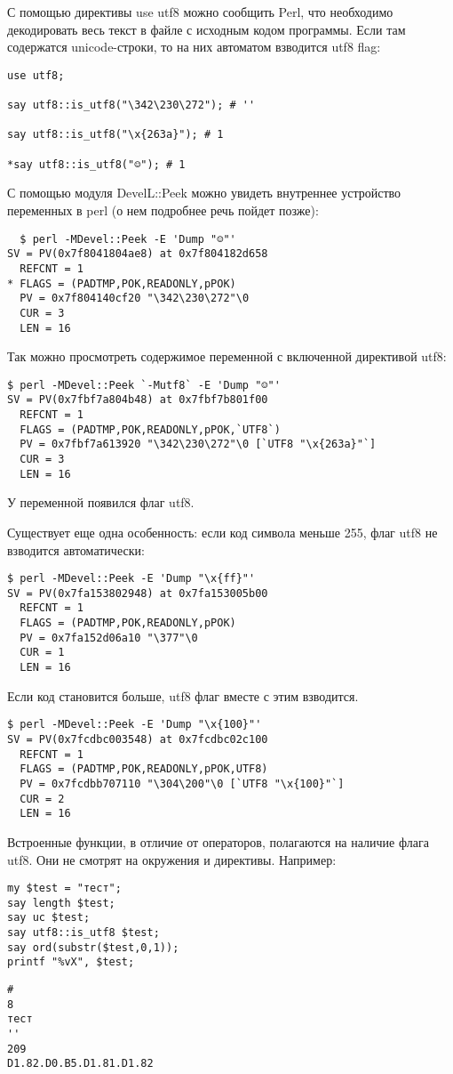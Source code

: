 С помощью директивы use utf8 можно сообщить Perl, что необходимо декодировать весь текст в файле с исходным кодом программы. Если там содержатся unicode-строки, то на них автоматом взводится utf8 flag:
\begin{verbatim}
use utf8;

say utf8::is_utf8("\342\230\272"); # ''

say utf8::is_utf8("\x{263a}"); # 1

*say utf8::is_utf8("☺"); # 1
\end{verbatim}
С помощью модуля DevelL::Peek можно увидеть внутреннее устройство переменных в perl (о нем подробнее речь пойдет позже):
\begin{verbatim}
  $ perl -MDevel::Peek -E 'Dump "☺"'
SV = PV(0x7f8041804ae8) at 0x7f804182d658
  REFCNT = 1
* FLAGS = (PADTMP,POK,READONLY,pPOK)
  PV = 0x7f804140cf20 "\342\230\272"\0
  CUR = 3
  LEN = 16
\end{verbatim}
Так можно просмотреть содержимое переменной с включенной директивой utf8:
\begin{verbatim}
$ perl -MDevel::Peek `-Mutf8` -E 'Dump "☺"'
SV = PV(0x7fbf7a804b48) at 0x7fbf7b801f00
  REFCNT = 1
  FLAGS = (PADTMP,POK,READONLY,pPOK,`UTF8`)
  PV = 0x7fbf7a613920 "\342\230\272"\0 [`UTF8 "\x{263a}"`]
  CUR = 3
  LEN = 16
\end{verbatim}
У переменной появился флаг utf8.

Существует еще одна особенность: если код символа меньше 255, флаг utf8 не взводится автоматически:
\begin{verbatim}
$ perl -MDevel::Peek -E 'Dump "\x{ff}"'
SV = PV(0x7fa153802948) at 0x7fa153005b00
  REFCNT = 1
  FLAGS = (PADTMP,POK,READONLY,pPOK)
  PV = 0x7fa152d06a10 "\377"\0
  CUR = 1
  LEN = 16
\end{verbatim}
Если код становится больше, utf8 флаг вместе с этим взводится.
\begin{verbatim}
$ perl -MDevel::Peek -E 'Dump "\x{100}"'
SV = PV(0x7fcdbc003548) at 0x7fcdbc02c100
  REFCNT = 1
  FLAGS = (PADTMP,POK,READONLY,pPOK,UTF8)
  PV = 0x7fcdbb707110 "\304\200"\0 [`UTF8 "\x{100}"`]
  CUR = 2
  LEN = 16
\end{verbatim}
Встроенные функции, в отличие от операторов, полагаются на наличие флага utf8. Они не смотрят на окружения и директивы. Например:\\
\begin{verbatim}
my $test = "тест";
say length $test;
say uc $test;
say utf8::is_utf8 $test;
say ord(substr($test,0,1));
printf "%vX", $test;
\end{verbatim}
\begin{verbatim}
#
8
тест
''
209
D1.82.D0.B5.D1.81.D1.82
\end{verbatim}

